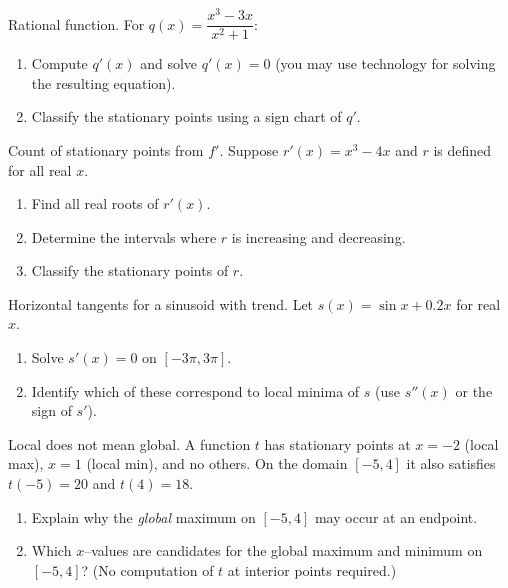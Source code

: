 \documentclass[11pt]{article}
\def\textbf#1{#1}%
\newcounter{question}
\begin{document}
\begin{question}
\textbf{Rational function.}
For $q(x)=\dfrac{x^{3}-3x}{x^{2}+1}$:
\begin{enumerate}
  \item Compute $q'(x)$ and solve $q'(x)=0$ (you may use technology for solving the resulting equation).
  \item Classify the stationary points using a sign chart of $q'$.
\end{enumerate}
\end{question}

\begin{question}
\textbf{Count of stationary points from $f'$.}
Suppose $r'(x)=x^{3}-4x$ and $r$ is defined for all real $x$.
\begin{enumerate}
  \item Find all real roots of $r'(x)$.
  \item Determine the intervals where $r$ is increasing and decreasing.
  \item Classify the stationary points of $r$.
\end{enumerate}
\end{question}

\begin{question}
\textbf{Horizontal tangents for a sinusoid with trend.}
Let $s(x)=\sin x+0.2x$ for real $x$.
\begin{enumerate}
  \item Solve $s'(x)=0$ on $[-3\pi,3\pi]$.
  \item Identify which of these correspond to local minima of $s$ (use $s''(x)$ or the sign of $s'$).
\end{enumerate}
\end{question}

\begin{question}
\textbf{Local does not mean global.}
A function $t$ has stationary points at $x=-2$ (local max), $x=1$ (local min), and no others. On the domain $[-5,4]$ it also satisfies $t(-5)=20$ and $t(4)=18$.
\begin{enumerate}
  \item Explain why the \emph{global} maximum on $[-5,4]$ may occur at an endpoint.
  \item Which $x$–values are candidates for the global maximum and minimum on $[-5,4]$? (No computation of $t$ at interior points required.)
\end{enumerate}
\end{question}
\end{document}
